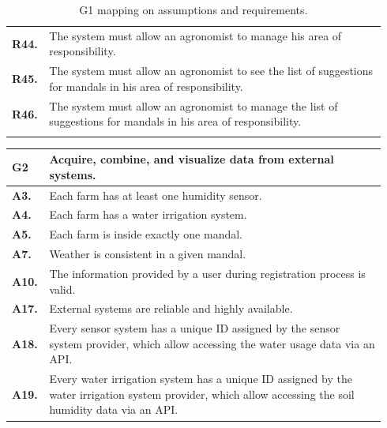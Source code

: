 \begin{longtable}{p{0.06\linewidth} p{0.88\linewidth}}
	\textbf{R44.} & The system must allow an agronomist to manage his area of responsibility.\\
	\textbf{R45.} & The system must allow an agronomist to see the list of suggestions for mandals in his area of responsibility.\\
	\textbf{R46.} & The system must allow an agronomist to manage the list of suggestions for mandals in his area of responsibility.\\
	
    \bottomrule
    \caption{G1 mapping on assumptions and requirements.}
\end{longtable}

\begin{longtable}{p{0.06\linewidth} p{0.88\linewidth}} 
    \toprule
    \textbf{G2} & Acquire, combine, and visualize data from external systems. \\ 
    \midrule
    \textbf{A3.} & Each farm has at least one humidity sensor.\\ 
    \textbf{A4.} & Each farm has a water irrigation system.\\ 
    \textbf{A5.} & Each farm is inside exactly one mandal.\\ 
    \textbf{A7.} & Weather is consistent in a given mandal.\\ 
    \textbf{A10.} & The information provided by a user during registration process is valid.\\ 
    \textbf{A17.} & External systems are reliable and highly available.\\
    \textbf{A18.} & Every sensor system has a unique ID assigned by the sensor system provider, which allow accessing the water usage data via an API. \\   
    \textbf{A19.} & Every water irrigation system has a unique ID assigned by the water irrigation system provider, which allow accessing the soil humidity data via an API. \\
    

\end{longtable}
